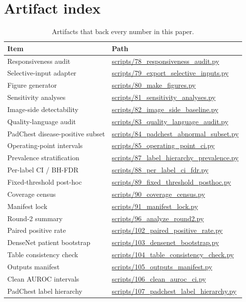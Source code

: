 \section{Artifact index}
\label{app:artifacts}

\begin{table}[H]
\centering
\footnotesize
\caption{Artifacts that back every number in this paper.}
\label{tab:artifacts}
\begin{tabular}{ll}
\toprule
Item & Path \\
\midrule
Responsiveness audit & \url{scripts/78_responsiveness_audit.py} \\
Selective-input adapter & \url{scripts/79_export_selective_inputs.py} \\
Figure generator & \url{scripts/80_make_figures.py} \\
Sensitivity analyses & \url{scripts/81_sensitivity_analyses.py} \\
Image-side detectability & \url{scripts/82_image_side_baseline.py} \\
Quality-language audit & \url{scripts/83_quality_language_audit.py} \\
PadChest disease-positive subset & \url{scripts/84_padchest_abnormal_subset.py} \\
Operating-point intervals & \url{scripts/85_operating_point_ci.py} \\
Prevalence stratification & \url{scripts/87_label_hierarchy_prevalence.py} \\
Per-label CI / BH-FDR & \url{scripts/88_per_label_ci_fdr.py} \\
Fixed-threshold post-hoc & \url{scripts/89_fixed_threshold_posthoc.py} \\
Coverage census & \url{scripts/90_coverage_census.py} \\
Manifest lock & \url{scripts/91_manifest_lock.py} \\
Round-2 summary & \url{scripts/96_analyze_round2.py} \\
Paired positive rate & \url{scripts/102_paired_positive_rate.py} \\
DenseNet patient bootstrap & \url{scripts/103_densenet_bootstrap.py} \\
Table consistency check & \url{scripts/104_table_consistency_check.py} \\
Outputs manifest & \url{scripts/105_outputs_manifest.py} \\
Clean AUROC intervals & \url{scripts/106_clean_auroc_ci.py} \\
PadChest label hierarchy & \url{scripts/107_padchest_label_hierarchy.py} \\

\end{tabular}
\end{table}
